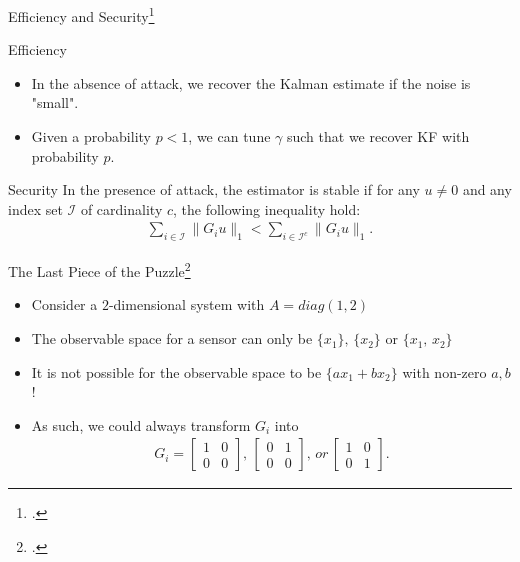 \documentclass[10pt]{beamer}
\begin{document}
\begin{frame}{Efficiency and Security\footcite{Liu2021}}
  \begin{block}{Efficiency}
    \begin{itemize}
      \item In the absence of attack, we recover the Kalman estimate if the noise is "small".
      \item Given a probability $p<1$, we can tune $\gamma$ such that we recover KF with probability $p$.
    \end{itemize}
  \end{block}
  \begin{block}{Security}
    In the presence of attack, the estimator is stable if for any $u\neq 0$ and any index set $\mathcal I$ of cardinality $c$, the following inequality hold:
    \begin{align*}
      \sum_{i\in \mathcal I} \|G_iu\|_1 < \sum_{i\in \mathcal I^c} \|G_iu\|_1. 
    \end{align*}
  \end{block}
\end{frame}

\begin{frame}{The Last Piece of the Puzzle\footcite{Mao2019}}
  \begin{itemize}
    \item Consider a $2$-dimensional system with $A = diag(1,2)$ 
    \item The observable space for a sensor can only be $\{x_1\},\,\{x_2\}$ or $\{x_1,\,x_2\}$
    \item It is not possible for the observable space to be $\{ax_1+bx_2\}$ with non-zero $a,b$!
    \item As such, we could always transform $G_i$ into
      \begin{align*}
	G_i = \begin{bmatrix}
	  1&0\\
	  0&0
	  \end{bmatrix} ,\,\begin{bmatrix}
	  0&1\\
	  0&0
	  \end{bmatrix} ,\,or\,\begin{bmatrix}
	  1&0\\
	  0&1
	\end{bmatrix} .
      \end{align*}
  \end{itemize}
\end{frame}
\end{document}
